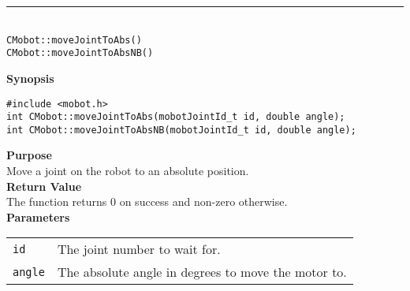 \noindent
\vspace{5pt}
\rule{4.5in}{0.015in}\\
\noindent
{\LARGE \texttt{CMobot::moveJointToAbs()}}\\
{\LARGE \texttt{CMobot::moveJointToAbsNB()}}\\
{}

\noindent
{\bf Synopsis}
\vspace{-8pt}
\begin{verbatim}
#include <mobot.h>
int CMobot::moveJointToAbs(mobotJointId_t id, double angle);
int CMobot::moveJointToAbsNB(mobotJointId_t id, double angle);
\end{verbatim}

\noindent
{\bf Purpose}\\
Move a joint on the robot to an absolute position.\\

\noindent
{\bf Return Value}\\
The function returns 0 on success and non-zero otherwise.\\

\noindent
{\bf Parameters}\\
\vspace{-0.1in}
\begin{description}
\item               
\begin{tabular}{p{10 mm}p{145 mm}}
\texttt{id} & The joint number to wait for. \\
\texttt{angle} & The absolute angle in degrees to move the motor to.  \\
\end{tabular}
\end{description}

